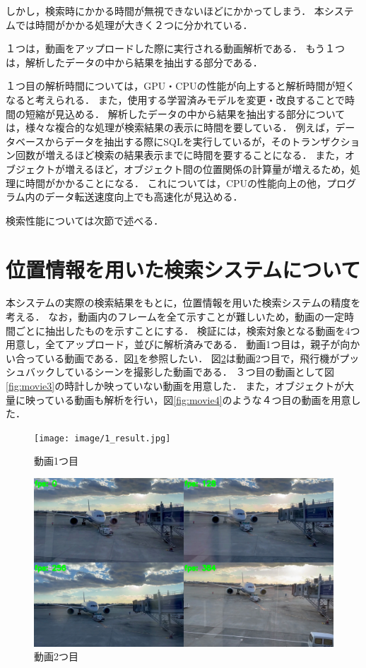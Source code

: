 \documentclass[a4j,12pt,dvipdfmx]{jreport}
\begin{document}
しかし，検索時にかかる時間が無視できないほどにかかってしまう．
本システムでは時間がかかる処理が大きく２つに分かれている．

１つは，動画をアップロードした際に実行される動画解析である．
もう１つは，解析したデータの中から結果を抽出する部分である．

１つ目の解析時間については，GPU・CPUの性能が向上すると解析時間が短くなると考えられる．
また，使用する学習済みモデルを変更・改良することで時間の短縮が見込める．
解析したデータの中から結果を抽出する部分については，様々な複合的な処理が検索結果の表示に時間を要している．
例えば，データベースからデータを抽出する際にSQLを実行しているが，そのトランザクション回数が増えるほど検索の結果表示までに時間を要することになる．
また，オブジェクトが増えるほど，オブジェクト間の位置関係の計算量が増えるため，処理に時間がかかることになる．
これについては，CPUの性能向上の他，プログラム内のデータ転送速度向上でも高速化が見込める．

検索性能については次節で述べる．

\section{位置情報を用いた検索システムについて}
本システムの実際の検索結果をもとに，位置情報を用いた検索システムの精度を考える．
なお，動画内のフレームを全て示すことが難しいため，動画の一定時間ごとに抽出したものを示すことにする．
検証には，検索対象となる動画を4つ用意し，全てアップロード，並びに解析済みである．
動画1つ目は，親子が向かい合っている動画である．図\ref{fig:movie1}を参照したい．
図\ref{fig:movie2}は動画2つ目で，飛行機がプッシュバックしているシーンを撮影した動画である．
３つ目の動画として図\ref{fig:movie3}の時計しか映っていない動画を用意した．
また，オブジェクトが大量に映っている動画も解析を行い，図\ref{fig:movie4}のような４つ目の動画を用意した．

\begin{figure}[H]
  \centering
  \texttt{[image: image/1\_result.jpg]}
  \caption{動画1つ目}
  \label{fig:movie1}
\end{figure}

\begin{figure}[H]
  \centering
  \includegraphics[width=13cm]{image/2_result.jpg}
  \caption{動画2つ目}
  \label{fig:movie2}
\end{figure}
\end{document}
